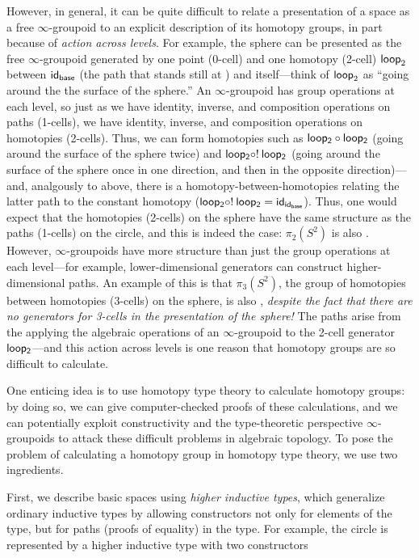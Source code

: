 However, in general, it can be quite difficult to relate a presentation
of a space as a free $\infty$-groupoid to an explicit description of its
homotopy groups, in part because of \emph{action across levels}.  For
example, the sphere can be presented as the free $\infty$-groupoid generated by
one point (0-cell)  and one homotopy (2-cell) $\mathsf{loop}_2$
between $\mathsf{id}_{{\mathsf{base}}}$ (the path that stands still at
) and itself---think of $\mathsf{loop}_2$ as ``going around the
the surface of the sphere.''  An $\infty$-groupoid has group operations
at each level, so just as we have identity, inverse, and composition
operations on paths (1-cells), we have identity, inverse, and
composition operations on homotopies (2-cells).  Thus, we can form
homotopies such as $\mathsf{loop_2} \mathbin{\circ} \mathsf{loop_2}$ (going around the
surface of the sphere twice) and $\mathsf{loop_2} \mathbin{\circ} ! \: \mathsf{loop_2}$
(going around the surface of the sphere once in one direction, and then
in the opposite direction)---and, analgously to above, there is a
homotopy-between-homotopies relating the latter path to the constant
homotopy ($\mathsf{loop_2} \mathbin{\circ} ! \: \mathsf{loop_2} =
\mathsf{id}_{{\mathsf{id}_{\mathsf{base}}}}$).  Thus, one would expect that the
homotopies (2-cells) on the sphere have the same structure as the paths
(1-cells) on the circle, and this is indeed the case: $\pi_2(S^2)$ is
also \Z.  However, $\infty$-groupoids have more structure than just the
group operations at each level---for example, lower-dimensional
generators can construct higher-dimensional paths.  An example of this
is that $\pi_3(S^2)$, the group of homotopies between homotopies
(3-cells) on the sphere, is also \Z, \emph{despite the fact that there
  are no generators for 3-cells in the presentation of the sphere!}  The
paths arise from the applying the algebraic operations of an
$\infty$-groupoid to the 2-cell generator $\mathsf{loop_2}$---and this
action across levels is one reason that homotopy groups are so difficult
to calculate.  

One enticing idea is to use homotopy type theory to calculate homotopy
groups: by doing so, we can give computer-checked proofs of these
calculations, and we can potentially exploit constructivity and the
type-theoretic perspective $\infty$-groupoids to attack these difficult
problems in algebraic topology.  To pose the problem of calculating a
homotopy group in homotopy type theory, we use two ingredients.  

First, we describe basic spaces using \emph{higher inductive types}, which
generalize ordinary inductive types by allowing constructors not only
for elements of the type, but for paths (proofs of equality) in the type.  For
example, the circle is represented by a higher inductive type with two
constructors

